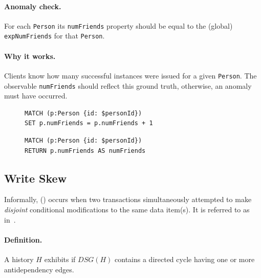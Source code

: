 \paragraph{Anomaly check.}
For each \texttt{Person} its \texttt{numFriends} property should be equal to the (global) \texttt{expNumFriends} for that \texttt{Person}.

\paragraph{Why it works.}
Clients know how many successful  instances were issued for a given \texttt{Person}.
The observable \texttt{numFriends} should reflect this ground truth, otherwise, an  anomaly must have occurred.

\begin{figure}[htb]
\centering
\begin{minipage}{0.41\linewidth}
\begin{lstlisting}[language=cypher,label=fig:lu1,caption=\tx{Lost Update $T_\mathrm{W}$}.]
MATCH (p:Person {id: $personId})
SET p.numFriends = p.numFriends + 1
\end{lstlisting}
\end{minipage}
\quad
\begin{minipage}{0.52\linewidth}
\begin{lstlisting}[language=cypher,label=fig:lu2,caption=\tx{Lost Update $T_\mathrm{R}$}.]
MATCH (p:Person {id: $personId})
RETURN p.numFriends AS numFriends
\end{lstlisting}
\end{minipage}
\end{figure}

\subsection{Write Skew}
\label{sec:write-skew}

Informally,  () occurs when two transactions simultaneously attempted to make \emph{disjoint} conditional modifications to the same data item(s).
It is referred to as  in~\cite{adya1999weak,DBLP:journals/tods/FeketeLOOS05}.

\paragraph{Definition.}
A history $H$ exhibits  if $\textit{DSG}(H)$ contains a directed cycle having one or more antidependency edges.

